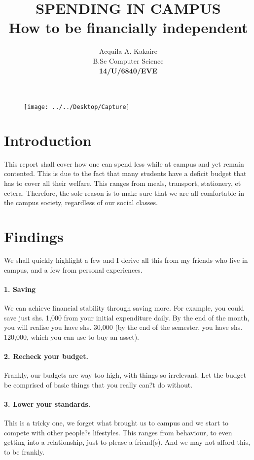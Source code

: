 \documentclass[10pt,a4paper]{report}
\begin{document}
	\begin{titlepage}
		\centering
		\begin{figure}
			\centering
			\texttt{[image: ../../Desktop/Capture]}
		\end{figure}
	\title{\textbf{SPENDING IN CAMPUS}
	\\How to be financially independent}
		\vfill
		\author{Acquila A. Kakaire
		\\B.Sc Computer Science
		\vspace{1.5cm}
		\\\textbf{14/U/6840/EVE}}
		
	\maketitle
	\end{titlepage}
	\section*{Introduction}
	This report shall cover how one can spend less while at campus and yet remain contented. This is due to the fact that many students have a deficit budget that has to cover all their welfare. This ranges from meals, transport, stationery, et cetera.
	Therefore, the sole reason is to make sure that we are all comfortable in the campus society, regardless of our social classes.
	\section*{Findings}
	We shall quickly highlight a few and I derive all this from my friends who live in campus, and a few from personal experiences.
	\paragraph{1. Saving}
	We can achieve financial stability through saving more. For example, you could save just shs. 1,000 from your initial expenditure daily. By the end of the month, you will realise you have shs. 30,000 (by the end of the semester, you have shs. 120,000, which you can use to buy an asset).
	\paragraph{2. Recheck your budget.}
	Frankly, our budgets are way too high, with things so irrelevant. Let the budget be comprised of basic things that you really can?t do without. 
	\paragraph{3. Lower your standards.}
	This is a tricky one, we forget what brought us to campus and we start to compete with other people?s lifestyles. This ranges from behaviour, to even getting into a relationship, just to please a friend(s). And we may not afford this, to be frankly.
\end{document}
